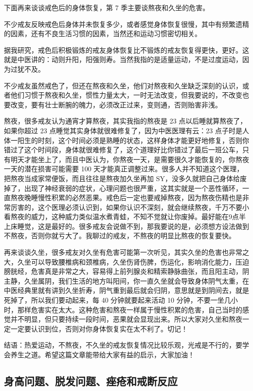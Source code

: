 \documentclass{ctexart}
\begin{document}
下面再来谈谈戒色后的身体恢复，第 7 季主要谈熬夜和久坐的危害。

不少戒友反映戒色后身体并未恢复多少，或者感觉身体恢复很慢，其中有频繁遗精的因素，还有不良生活习惯的因素，当然还和运动习惯密切相关。

据我研究，戒色后积极锻炼的戒友身体恢复比不锻炼的戒友恢复得更快，更好。这就是中医讲的：动则升阳，阳强则寿。当然我指的是适量运动，不是过度运动，因为过犹不及。

不少戒友虽然戒色了，但还在熬夜和久坐，他们对熬夜和久坐缺乏深刻的认识，或者他们习惯于熬夜和久坐，惯性力量太大，一时无法改变，但我要说的，不改变也要改变，要有壮士断腕的魄力，必须改正过来，变则通，否则贻害非浅。

熬夜，很多戒友认为通宵才算熬夜，其实我指的熬夜是 23 点以后睡就算熬夜了，如果你超过 23 点睡觉其实身体就很难修复了，因为中医医理有云：23 点子时是人体一阳生的时刻，这个时间必须是熟睡的状态，这样身体才能更好地修复，否则你错过了这个时间段，身体就很难修复了，这个道理好比你错过了最后一班公车，只有明天才能坐上了，而且中医认为，你熬夜一天，是需要很久才能恢复的，你熬夜一天的潜在损害可能需要 100 天才能真正调整过来。很多人并不知道这个医理，把熬夜当成家常便饭，而且往往是熬夜加久坐再加 SY，没多久就把自己身体给废掉了，出现了神经衰弱的症状，心理问题也很严重，这其实就是一个恶性循环，一直熬夜晚睡慢性积累的必然恶果。戒色后一定也要戒掉熬夜，因为熬夜伤精也是非常厉害的，这个医理必须认识到，如果你认识不深刻，就会继续熬夜，千万不要小看熬夜的威力，这种威力类似温水煮青蛙，不知不觉就让你废掉。最好能在9点半上床睡觉，这是最好的。很多戒友会说做不到，那我要说的是，必须想方设法做到不熬夜，否则你就亏大了。我聊过的戒友，不熬夜的明显比熬夜的恢复要快。

再来谈谈久坐，很多戒友对久坐有危害可能第一次听见，其实久坐的危害也非常之大，久坐可以导致腰椎病和颈椎病，久坐伤肾伤脾，伤运化，影响消化能力，压迫膀胱经，危害真是非常之大，容易得上前列腺炎和精索静脉曲张，而且阳主动，阴主静，久坐属阴，我们生活的地方叫阳间，你一直久坐就会导致身体阴气太重，在中医经典里就有讲到久坐折寿，阴气重到最后就会归阴，意思就是到阴间去，就是死掉了，所以我们要动起来，每 40 分钟就要起来活动 10 分钟，不要一坐几小时，那样危害实在太大。这种危害和熬夜一样属于慢性积累的危害，自己当时的感觉并不明显，但只要持续一段时间，恶果就会显现出来。所以大家对久坐和熬夜一定一定要认识到位，否则对你身体恢复实在太不利了。切记！

结语：热爱运动，不熬夜，不久坐的戒友恢复情况比较乐观，光戒是不行的，要学会养生之道。希望这篇文章能带给大家有益的启示，大家加油！

\subsection{身高问题、脱发问题、痤疮和戒断反应}
\end{document}
